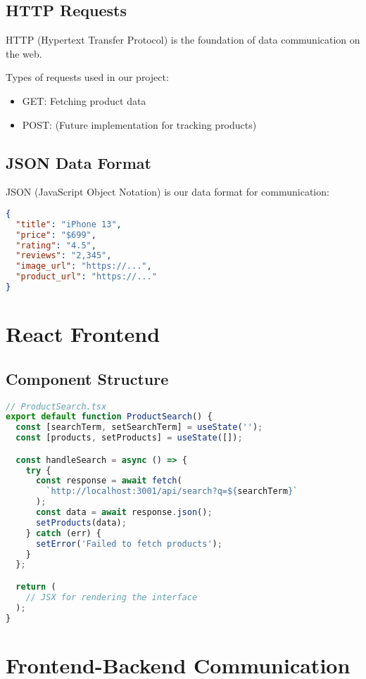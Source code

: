 \documentclass[12pt,a4paper]{article}
\begin{document}
\subsection{HTTP Requests}
HTTP (Hypertext Transfer Protocol) is the foundation of data communication on the web.

Types of requests used in our project:
\begin{itemize}
    \item GET: Fetching product data
    \item POST: (Future implementation for tracking products)
\end{itemize}

\subsection{JSON Data Format}
JSON (JavaScript Object Notation) is our data format for communication:
\begin{lstlisting}[language=JSON]
{
  "title": "iPhone 13",
  "price": "$699",
  "rating": "4.5",
  "reviews": "2,345",
  "image_url": "https://...",
  "product_url": "https://..."
}
\end{lstlisting}

\section{React Frontend}
\subsection{Component Structure}
\begin{lstlisting}[language=JavaScript]
// ProductSearch.tsx
export default function ProductSearch() {
  const [searchTerm, setSearchTerm] = useState('');
  const [products, setProducts] = useState([]);

  const handleSearch = async () => {
    try {
      const response = await fetch(
        `http://localhost:3001/api/search?q=${searchTerm}`
      );
      const data = await response.json();
      setProducts(data);
    } catch (err) {
      setError('Failed to fetch products');
    }
  };

  return (
    // JSX for rendering the interface
  );
}
\end{lstlisting}

\section{Frontend-Backend Communication}
\end{document}
